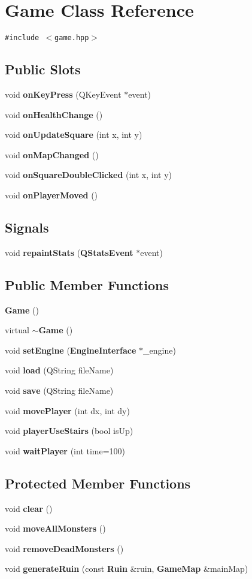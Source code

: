 \section{Game Class Reference}
\label{classGame}
{\tt \#include $<$game.hpp$>$}

\subsection*{Public Slots}
\begin{CompactItemize}
\item 
void {\bf on\-Key\-Press} (QKey\-Event $\ast$event)
\item 
void {\bf on\-Health\-Change} ()
\item 
void {\bf on\-Update\-Square} (int x, int y)
\item 
void {\bf on\-Map\-Changed} ()
\item 
void {\bf on\-Square\-Double\-Clicked} (int x, int y)
\item 
void {\bf on\-Player\-Moved} ()
\end{CompactItemize}
\subsection*{Signals}
\begin{CompactItemize}
\item 
void {\bf repaint\-Stats} ({\bf QStats\-Event} $\ast$event)
\end{CompactItemize}
\subsection*{Public Member Functions}
\begin{CompactItemize}
\item 
{\bf Game} ()
\item 
virtual {\bf $\sim$Game} ()
\item 
void {\bf set\-Engine} ({\bf Engine\-Interface} $\ast$\_\-engine)
\item 
void {\bf load} (QString file\-Name)
\item 
void {\bf save} (QString file\-Name)
\item 
void {\bf move\-Player} (int dx, int dy)
\item 
void {\bf player\-Use\-Stairs} (bool is\-Up)
\item 
void {\bf wait\-Player} (int time=100)
\end{CompactItemize}
\subsection*{Protected Member Functions}
\begin{CompactItemize}
\item 
void {\bf clear} ()
\item 
void {\bf move\-All\-Monsters} ()
\item 
void {\bf remove\-Dead\-Monsters} ()
\item 
void {\bf generate\-Ruin} (const {\bf Ruin} \&ruin, {\bf Game\-Map} \&main\-Map)
\end{CompactItemize}
